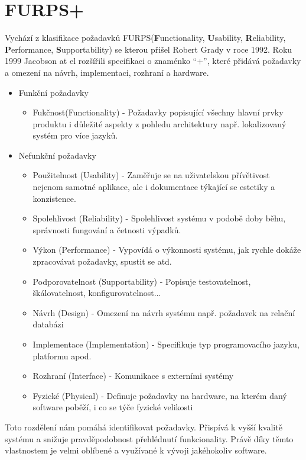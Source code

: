 \section{FURPS+}
	Vychází z klasifikace požadavků FURPS(\textbf{F}unctionality, \textbf{U}sability, \textbf{R}eliability, \textbf{P}erformance, \textbf{S}upportability) se kterou přišel Robert Grady v roce 1992. Roku 1999 Jacobson at el rozšířili specifikaci o znaménko \enquote{+}, které přidává požadavky a omezení na návrh, implementaci, rozhraní a hardware\cite{furps}. 
	
	\begin{itemize}
		\item Funkční požadavky
			\begin{itemize}
				\item Fukčnost(Functionality) - Požadavky popisující všechny hlavní prvky produktu i důležité aspekty z pohledu architektury např. lokalizovaný systém pro více jazyků.
			\end{itemize}
		\item Nefunkční požadavky
			\begin{itemize}
				\item Použitelnost (Usability) - Zaměřuje se na uživatelskou přívětivost nejenom samotné aplikace, ale i dokumentace týkající se estetiky a konzistence.
				\item Spolehlivost (Reliability) - Spolehlivost systému v podobě doby běhu, správnosti fungování a četnosti výpadků.
				\item Výkon (Performance) - Vypovídá o výkonnosti systému, jak rychle dokáže zpracovávat požadavky, spustit se atd.
				\item Podporovatelnost (Supportability) - Popisuje testovatelnost, škálovatelnost, konfigurovatelnost...
				\item Návrh (Design) - Omezení na návrh systému např. požadavek na relační databázi
				\item Implementace (Implementation) - Specifikuje typ programovacího jazyku, platformu apod.
				\item Rozhraní (Interface) - Komunikace s externími systémy
				\item Fyzické (Physical) - Definuje požadavky na hardware, na kterém daný software poběží, i co se týče fyzické velikosti
			\end{itemize}
	\end{itemize}
	
	Toto rozdělení nám pomáhá identifikovat požadavky. Přispívá k vyšší kvalitě systému a snižuje pravděpodobnost přehlédnutí funkcionality. Právě díky těmto vlastnostem je velmi oblíbené a využívané k vývoji jakéhokoliv software. 